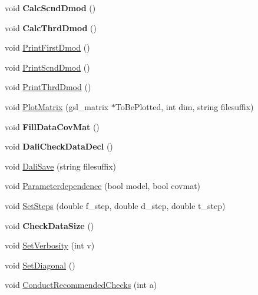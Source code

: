 \begin{DoxyCompactItemize}
\item 
\hypertarget{classDaliBase_aca71df68c84675b37620437721696ef0}{void {\bfseries Calc\-Scnd\-Dmod} ()}\label{classDaliBase_aca71df68c84675b37620437721696ef0}

\item 
\hypertarget{classDaliBase_ac73f100410c08b92e448784bcc5bf6c1}{void {\bfseries Calc\-Thrd\-Dmod} ()}\label{classDaliBase_ac73f100410c08b92e448784bcc5bf6c1}

\item 
void \hyperlink{classDaliBase_aff17417c8d73ab2d75d8f54c7d1ea7d1}{Print\-First\-Dmod} ()
\item 
void \hyperlink{classDaliBase_a9ec7ff196ea59635727ba378b481aa40}{Print\-Scnd\-Dmod} ()
\item 
void \hyperlink{classDaliBase_a55b1ecf5e2f75758ef1aa7c6614bc642}{Print\-Thrd\-Dmod} ()
\item 
void \hyperlink{classDaliBase_a28df9c6ce107f5c8c1e757c2a5924d04}{Plot\-Matrix} (gsl\-\_\-matrix $\ast$To\-Be\-Plotted, int dim, string filesuffix)
\item 
\hypertarget{classDaliBase_add3632260f70ee5286d795f2e7f773d1}{void {\bfseries Fill\-Data\-Cov\-Mat} ()}\label{classDaliBase_add3632260f70ee5286d795f2e7f773d1}

\item 
\hypertarget{classDaliBase_ac63422e32e8fb16a9eda2b8da3a1f944}{void {\bfseries Dali\-Check\-Data\-Decl} ()}\label{classDaliBase_ac63422e32e8fb16a9eda2b8da3a1f944}

\item 
void \hyperlink{classDaliBase_af6ce56b286ef5f014c74ae9f83051e19}{Dali\-Save} (string filesuffix)
\item 
void \hyperlink{classDaliBase_a8cdc64cd3dd46ce4ce1a70f87061dda9}{Parameterdependence} (bool model, bool covmat)
\item 
void \hyperlink{classDaliBase_a8cd32906da8de171eff331ce09d256f2}{Set\-Steps} (double f\-\_\-step, double d\-\_\-step, double t\-\_\-step)
\item 
\hypertarget{classDaliBase_a0f273ab603afac40a8939e20a64feb80}{void {\bfseries Check\-Data\-Size} ()}\label{classDaliBase_a0f273ab603afac40a8939e20a64feb80}

\item 
void \hyperlink{classDaliBase_a75d9801166752bd17af5a30ca24aea20}{Set\-Verbosity} (int v)
\item 
void \hyperlink{classDaliBase_a29c3f9350f4f0990bd803814f4ec7137}{Set\-Diagonal} ()
\item 
void \hyperlink{classDaliBase_a23e24dbbfeadd57d77bfd7921863c744}{Conduct\-Recommended\-Checks} (int a)
\end{DoxyCompactItemize}
